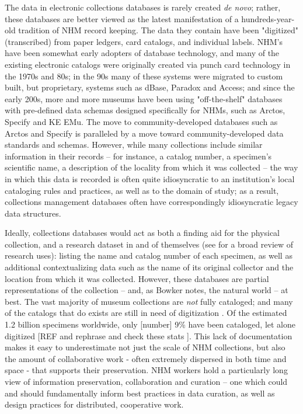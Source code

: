 The data in electronic collections databases is rarely created \textit{de novo}; rather, these databases are better viewed as the latest manifestation of a hundreds-year-old tradition of NHM record keeping. The data they contain have been "digitized" (transcribed) from paper ledgers, card catalogs, and individual labels. NHM's have been somewhat early adopters of database technology, and many of the existing electronic catalogs were originally created via punch card technology in the 1970s and 80s; in the 90s many of these systems were migrated to custom built, but proprietary, systems such as dBase, Paradox and Access; and since the early 200s, more and more museums have been using "off-the-shelf" databases with pre-defined data schemas designed specifically for NHMs, such as Arctos, Specify and KE EMu. The move to community-developed databases such as Arctos and Specify is paralleled by a move toward community-developed data standards and schemas.  However, while many collections include similar information in their records – for instance, a catalog number, a specimen’s scientific name, a description of the locality from which it was collected – the way in which this data is recorded is often quite idiosyncratic to an institution’s local cataloging rules and practices, as well as to the domain of study; as a result, collections management databases often have correspondingly idiosyncratic legacy data structures.

Ideally, collections databases would act as both a finding aid for the physical collection, and a research dataset in and of themselves (see \cite{Chapman2005} for a broad review of research uses): listing the name and catalog number of each specimen, as well as additional contextualizing data such as the name of its original collector and the location from which it was collected. However, these databases are partial representations of the collection -- and, as Bowker notes, the natural world \cite{Bowker_2000} -- at best. The vast majority of museum collections are \textit{not} fully cataloged; and many of the catalogs that do exists are still in need of digitization \cite{Beaman_2012}. Of the estimated 1.2 billion specimens worldwide, only [number] 9\% have been cataloged, let alone digitized [REF and rephrase and check these stats \cite{Ari_o_2010}]. This lack of documentation makes it easy to underestimate not just the scale of NHM collections, but also the amount of collaborative work  - often extremely dispersed in both time and space - that supports their preservation. NHM workers hold a particularly long view of information preservation, collaboration and curation -- one which could and should fundamentally inform best practices in data curation, as well as design practices for distributed, cooperative work.

